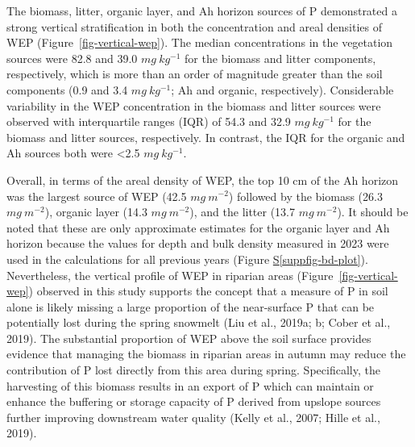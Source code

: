 \documentclass[
]{agujournal2019}
\newcommand*\quartosuppfigref[1]{Figure \hyperref[#1]{S\ref{#1}}}
\begin{document}
The biomass, litter, organic layer, and Ah horizon sources of P
demonstrated a strong vertical stratification in both the concentration
and areal densities of WEP (Figure~\ref{fig-vertical-wep}). The median
concentrations in the vegetation sources were 82.8 and 39.0
\(mg~kg^{-1}\) for the biomass and litter components, respectively,
which is more than an order of magnitude greater than the soil
components (0.9 and 3.4 \(mg~kg^{-1}\); Ah and organic, respectively).
Considerable variability in the WEP concentration in the biomass and
litter sources were observed with interquartile ranges (IQR) of 54.3 and
32.9 \(mg~kg^{-1}\) for the biomass and litter sources, respectively. In
contrast, the IQR for the organic and Ah sources both were \textless2.5
\(mg~kg^{-1}\).

Overall, in terms of the areal density of WEP, the top 10 cm of the Ah
horizon was the largest source of WEP (42.5 \(mg~m^{-2}\)) followed by
the biomass (26.3 \(mg~m^{-2}\)), organic layer (14.3 \(mg~m^{-2}\)),
and the litter (13.7 \(mg~m^{-2}\)). It should be noted that these are
only approximate estimates for the organic layer and Ah horizon because
the values for depth and bulk density measured in 2023 were used in the
calculations for all previous years
(\quartosuppfigref{suppfig-bd-plot}). Nevertheless, the vertical profile
of WEP in riparian areas (Figure~\ref{fig-vertical-wep}) observed in
this study supports the concept that a measure of P in soil alone is
likely missing a large proportion of the near-surface P that can be
potentially lost during the spring snowmelt (Liu et al., 2019a; b; Cober
et al., 2019). The substantial proportion of WEP above the soil surface
provides evidence that managing the biomass in riparian areas in autumn
may reduce the contribution of P lost directly from this area during
spring. Specifically, the harvesting of this biomass results in an
export of P which can maintain or enhance the buffering or storage
capacity of P derived from upslope sources further improving downstream
water quality (Kelly et al., 2007; Hille et al., 2019).
\end{document}
